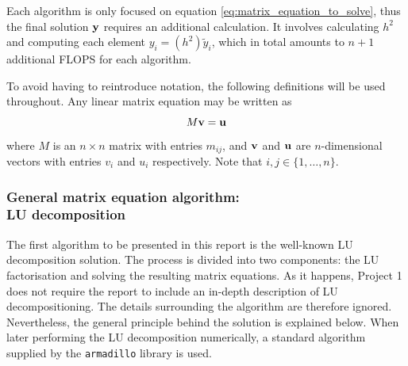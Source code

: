 \documentclass[reprint,english]{revtex4-1}
\begin{document}
Each algorithm is only focused on equation \eqref{eq:matrix_equation_to_solve}, thus the final solution \(\vb{y}\) requires an additional calculation. It involves calculating \(h^2\) and computing each element \(y_i=(h^2)\tilde{y}_i\), which in total amounts to \(n+1\) additional FLOPS for each algorithm.

To avoid having to reintroduce notation, the following definitions will be used throughout. Any linear matrix equation may be written as
\begin{equation}\label{eq:general_linear_matrix_equation}
M\vb{v}=\vb{u}
\end{equation}
where \(M\) is an \(n\times n\) matrix with entries \(m_{ij}\), and \(\vb{v}\) and \(\vb{u}\) are \(n\)-dimensional vectors with entries \(v_i\) and \(u_i\) respectively. Note that \(i,j\in\{1,\ldots,n\}\).
\newpage
\subsubsection{General matrix equation algorithm:\\LU decomposition}
The first algorithm to be presented in this report is the well-known LU decomposition solution. The process is divided into two components: the LU factorisation and solving the resulting matrix equations. As it happens, Project 1 does not require the report to include an in-depth description of LU decompositioning. The details surrounding the algorithm are therefore ignored. Nevertheless, the general principle behind the solution is explained below. When later performing the LU decomposition numerically, a standard algorithm supplied by the \texttt{armadillo} library is used.
\end{document}
